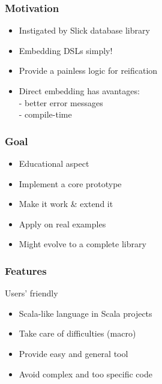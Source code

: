 \documentclass{beamer}
\begin{document}

\begin{frame}[fragile]
\frametitle{Motivation}
\begin{itemize}
\item Instigated by Slick database library
\item Embedding DSLs simply!
\item Provide a painless logic for reification
\item Direct embedding has avantages:\\
	- better error messages\\
	- compile-time\\
\end{itemize}




\end{frame}


\begin{frame}
\frametitle{Goal}
\begin{itemize}
\item Educational aspect
\item Implement a core prototype
\item Make it work \& extend it
\item Apply on real examples
\item Might evolve to a complete library
\end{itemize}
\end{frame}



\begin{frame}
\frametitle{Features}

\centerline{Users' friendly}
\begin{itemize}
\item Scala-like language in Scala projects
\item Take care of difficulties (macro)
\item Provide easy and general tool
\item Avoid complex and too specific code
\end{itemize}

\end{frame}

\end{document}
